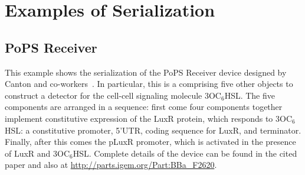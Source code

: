 \section{Examples of Serialization}
\label{ser:examples}


\subsection{PoPS Receiver}

This example shows the serialization of the PoPS Receiver device designed by Canton and co-workers~\cite{canton-natbio-2008}. 
In particular, this is a  comprising five other  objects to construct a detector for the cell-cell signaling molecule 3OC$_6$HSL.
The five components are arranged in a sequence:
first come four components together implement constitutive expression of the LuxR protein, which responds to 3OC$_6$HSL: a constitutive promoter, 5'UTR, coding sequence for LuxR, and terminator.
Finally, after this comes the pLuxR promoter, which is activated in the presence of LuxR and 3OC$_6$HSL.
%
Complete details of the device can be found in the cited paper and also at \url{http://parts.igem.org/Part:BBa_F2620}.

